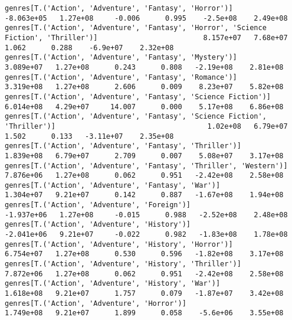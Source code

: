 \documentclass[11pt]{article}
\begin{document}
\begin{Verbatim}[commandchars=\\\{\}]
genres[T.('Action', 'Adventure', 'Fantasy', 'Horror')]                                                       -8.063e+05   1.27e+08     -0.006      0.995    -2.5e+08    2.49e+08
genres[T.('Action', 'Adventure', 'Fantasy', 'Horror', 'Science Fiction', 'Thriller')]                         8.157e+07   7.68e+07      1.062      0.288    -6.9e+07    2.32e+08
genres[T.('Action', 'Adventure', 'Fantasy', 'Mystery')]                                                       3.089e+07   1.27e+08      0.243      0.808   -2.19e+08    2.81e+08
genres[T.('Action', 'Adventure', 'Fantasy', 'Romance')]                                                       3.319e+08   1.27e+08      2.606      0.009    8.23e+07    5.82e+08
genres[T.('Action', 'Adventure', 'Fantasy', 'Science Fiction')]                                               6.014e+08   4.29e+07     14.007      0.000    5.17e+08    6.86e+08
genres[T.('Action', 'Adventure', 'Fantasy', 'Science Fiction', 'Thriller')]                                    1.02e+08   6.79e+07      1.502      0.133   -3.11e+07    2.35e+08
genres[T.('Action', 'Adventure', 'Fantasy', 'Thriller')]                                                      1.839e+08   6.79e+07      2.709      0.007    5.08e+07    3.17e+08
genres[T.('Action', 'Adventure', 'Fantasy', 'Thriller', 'Western')]                                           7.876e+06   1.27e+08      0.062      0.951   -2.42e+08    2.58e+08
genres[T.('Action', 'Adventure', 'Fantasy', 'War')]                                                           1.304e+07   9.21e+07      0.142      0.887   -1.67e+08    1.94e+08
genres[T.('Action', 'Adventure', 'Foreign')]                                                                 -1.937e+06   1.27e+08     -0.015      0.988   -2.52e+08    2.48e+08
genres[T.('Action', 'Adventure', 'History')]                                                                 -2.041e+06   9.21e+07     -0.022      0.982   -1.83e+08    1.78e+08
genres[T.('Action', 'Adventure', 'History', 'Horror')]                                                        6.754e+07   1.27e+08      0.530      0.596   -1.82e+08    3.17e+08
genres[T.('Action', 'Adventure', 'History', 'Thriller')]                                                      7.872e+06   1.27e+08      0.062      0.951   -2.42e+08    2.58e+08
genres[T.('Action', 'Adventure', 'History', 'War')]                                                           1.618e+08   9.21e+07      1.757      0.079   -1.87e+07    3.42e+08
genres[T.('Action', 'Adventure', 'Horror')]                                                                   1.749e+08   9.21e+07      1.899      0.058    -5.6e+06    3.55e+08

\end{Verbatim}
\end{document}
